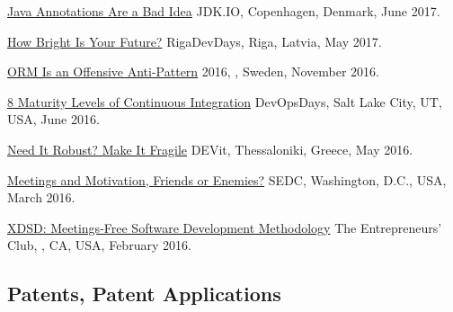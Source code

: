 \documentclass{yb}
\begin{document}
\begin{samepage}
\href{https://youtu.be/cv23Z6xpwDw}{Java Annotations Are a Bad Idea}\newline
JDK.IO, Copenhagen, Denmark, June 2017.
\end{samepage}

\begin{samepage}
\href{https://www.youtube.com/watch?v=IGbteQpTNCA}{How Bright Is Your Future?}\newline
RigaDevDays, Riga, Latvia, May 2017.
\end{samepage}

\begin{samepage}
\href{https://www.youtube.com/watch?v=03PXmPc7Q3g}{ORM Is an Offensive Anti-Pattern}\newline
{} 2016, , Sweden, November 2016.
\end{samepage}

\begin{samepage}
\href{https://www.youtube.com/watch?v=3dJP_LtUGgg}{8 Maturity Levels of Continuous Integration}\newline
DevOpsDays, Salt Lake City, UT, USA, June 2016.
\end{samepage}

\begin{samepage}
\href{https://www.youtube.com/watch?v=nCGBgI1MNwE}{Need It Robust? Make It Fragile}\newline
DEVit, Thessaloniki, Greece, May 2016.
\end{samepage}

\begin{samepage}
\href{https://www.youtube.com/watch?v=LB_YLWhGrco}{Meetings and Motivation, Friends or Enemies?}\newline
SEDC, Washington, D.C., USA, March 2016.
\end{samepage}

\begin{samepage}
\href{https://www.youtube.com/watch?v=qRZYJGYdrwk}{XDSD: Meetings-Free Software Development Methodology}\newline
The Entrepreneurs' Club, , CA, USA, February 2016.
\end{samepage}

\subsection*{Patents, Patent Applications}
\end{document}

